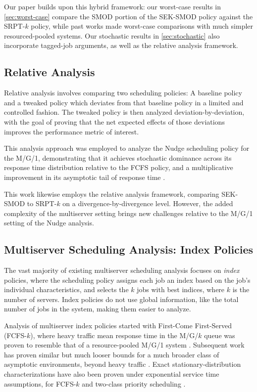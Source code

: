 \documentclass[acmsmall]{acmart}
\begin{document}
Our paper builds upon this hybrid framework: our worst-case results in \cref{sec:worst-case} compare the SMOD portion of the SEK-SMOD policy against the SRPT-$k$ policy, while past works made worst-case comparisons with much simpler resourced-pooled systems.
Our stochastic results in \cref{sec:stochastic} also incorporate tagged-job arguments, as well as the relative analysis framework.

\subsection{Relative Analysis}
\label{sec:prior-relative}

Relative analysis involves comparing two scheduling policies:
A baseline policy and a tweaked policy which deviates from that baseline policy in a limited and controlled fashion.
The tweaked policy is then analyzed deviation-by-deviation,
with the goal of proving that the net expected effects of those deviations improves the performance metric of interest.

This analysis approach was employed to analyze the Nudge scheduling policy for the M/G/1, demonstrating that it achieves stochastic dominance across its response time distribution relative to the FCFS policy, and a multiplicative improvement in its asymptotic tail of response time \cite{grosof-etal-nudge-2021}.

This work likewise employs the relative analysis framework, comparing SEK-SMOD to SRPT-$k$ on a divergence-by-divergence level. However, the added complexity of the multiserver setting brings new challenges relative to the M/G/1 setting of the Nudge analysis.


\subsection{Multiserver Scheduling Analysis: Index Policies}
\label{sec:prior-multiserver}
The vast majority of existing multiserver scheduling analysis focuses on \emph{index} policies, where the scheduling policy assigns each job an index based on the job's individual characteristics, and selects the $k$ jobs with best indices, where $k$ is the number of servers. Index policies do not use global information, like the total number of jobs in the system, making them easier to analyze.

Analysis of multiserver index policies started with First-Come First-Served (FCFS-$k$), where heavy traffic mean response time in the M/G/$k$ queue
was proven to resemble that of a resource-pooled M/G/1 system \cite{loulou1973multi,kollerstrom1974heavy-1,kollerstrom1979heavy-ii,grosof-et-al2022wcfs}.
Subsequent work has proven similar but much looser bounds for a much broader class of asymptotic environments, beyond heavy traffic \cite{yuan-et-al2025simple-explicit}.
Exact stationary-distribution characterizations have also been proven under exponential service time assumptions, for FCFS-$k$ and two-class priority scheduling \cite{sleptchenko-et-al2005exact}.
\end{document}

